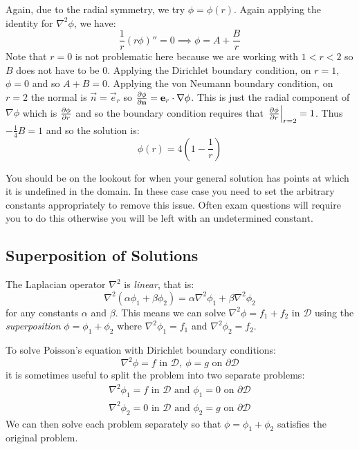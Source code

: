 \documentclass[../main.tex]{subfiles}
\begin{document}
\begin{example}
\begin{enumerate}
      Again, due to the radial symmetry, we try $\phi = \phi(r)$.
      Again applying the identity for $\nabla^2 \phi$, we have:
      \[
        \frac{1}{r}(r \phi)'' = 0 \implies \phi = A + \frac{B}{r}
      \]
      Note that $r = 0$ is not problematic here because we are working with $1 < r < 2$ so $B$ does not have to be 0.
      Applying the Dirichlet boundary condition, on $r = 1$, $\phi = 0$ and so $A + B = 0$.
      Applying the von Neumann boundary condition, on $r = 2$ the normal is $\vec{n} = \vec{e}_r$ so $\pderiv{\phi}{\vec{n}} = \vec{e}_r \cdot \nabla \phi$.
      This is just the radial component of $\nabla \phi$ which is $\pderiv{\phi}{r}$ and so the boundary condition requires that $\at{\pderiv{\phi}{r}}{r = 2} = 1$.
      Thus $-\frac{1}{4}B = 1$ and so the solution is:
      \[
        \phi(r) = 4\left(1 - \frac{1}{r}\right)
      \]
  \end{enumerate}
\end{example}
\begin{remark}[Advice]
  You should be on the lookout for when your general solution has points at which it is undefined in the domain.
  In these case case you need to set the arbitrary constants appropriately to remove this issue.
  Often exam questions will require you to do this otherwise you will be left with an undetermined constant.
\end{remark}
\subsection{Superposition of Solutions}
The Laplacian operator $\nabla^2$ is \textit{linear}, that is:
\[
  \nabla^2(\alpha \phi_1 + \beta \phi_2) = \alpha \nabla^2 \phi_1 + \beta \nabla^2 \phi_2
\]
for any constants $\alpha$ and $\beta$.
This means we can solve $\nabla^2 \phi = f_1 + f_2$ in $\mathscr{D}$ using the \textit{superposition} $\phi = \phi_1 + \phi_2$ where $\nabla^2 \phi_1 = f_1$ and $\nabla^2 \phi_2 = f_2$.

To solve Poisson's equation with Dirichlet boundary conditions:
\[
  \nabla^2 \phi = f \text{ in } \mathscr{D},\ \phi = g \text{ on } \partial \mathscr{D}
\]
it is sometimes useful to split the problem into two separate problems:
\begin{align*}
  \nabla^2 \phi_1 = f \text{ in } \mathscr{D} \text{ and } \phi_1 = 0 \text{ on } \partial \mathscr{D} \\
  \nabla^2 \phi_2 = 0 \text{ in } \mathscr{D} \text{ and } \phi_2 = g \text{ on } \partial \mathscr{D}
\end{align*}
We can then solve each problem separately so that $\phi = \phi_1 + \phi_2$ satisfies the original problem.
\end{document}
